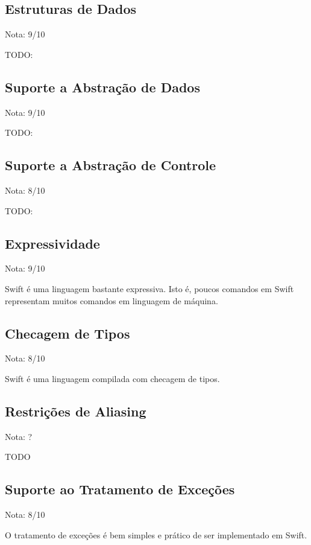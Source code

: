 \documentclass[rel_mlp]{iiufrgs}
\begin{document}
\subsection{Estruturas de Dados}

Nota: 9/10

TODO:

\subsection{Suporte a Abstração de Dados}

Nota: 9/10

TODO:

\subsection{Suporte a Abstração de Controle}

Nota: 8/10

TODO:

\subsection{Expressividade}

Nota: 9/10

Swift é uma linguagem bastante expressiva. Isto é, poucos comandos em Swift representam muitos comandos em linguagem de máquina.

\subsection{Checagem de Tipos}

Nota: 8/10

Swift é uma linguagem compilada com checagem de tipos.

\subsection{Restrições de Aliasing}

Nota: ?

TODO

\subsection{Suporte ao Tratamento de Exceções}

Nota: 8/10

O tratamento de exceções é bem simples e prático de ser implementado em Swift.
\end{document}

